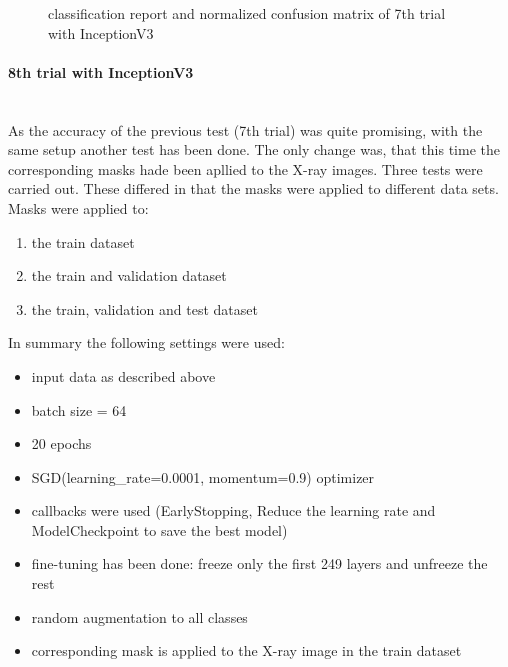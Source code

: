 \documentclass{article}
\begin{document}
\begin{figure}%
  \centering
  \qquad
  \caption{classification report and normalized confusion matrix of 7th trial with InceptionV3}
  \label{fig:inceptionv3_10_results}
\end{figure}


\paragraph{8th trial with InceptionV3}\mbox{}\\
As the accuracy of the previous test (7th trial) was quite promising, with the same setup another test has been done. The only change was, that this time the corresponding masks hade been apllied to the X-ray images. 
Three tests were carried out.  These differed in that the masks were applied to different data sets. Masks were applied to:
\begin{enumerate}
\item the train dataset
\item the train and validation dataset
\item the train, validation and test dataset
\end{enumerate}

In summary the following settings were used: 
\begin{itemize}
\item input data as described above
\item batch size = 64
\item 20 epochs 
\item SGD(learning\_rate=0.0001, momentum=0.9) optimizer
\item callbacks were used (EarlyStopping, Reduce the learning rate and ModelCheckpoint to save the best model)
\item fine-tuning has been done: freeze only the first 249 layers and unfreeze the rest
\item random augmentation to all classes 
\item corresponding mask is applied to the X-ray image in the train dataset
\end{itemize}
\end{document}

